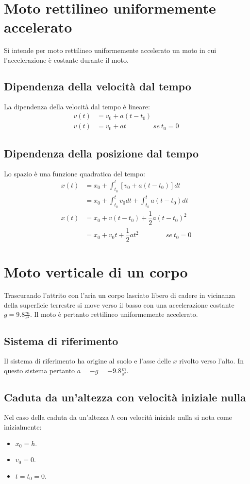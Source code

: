 \documentclass[class=book, crop=false, oneside, 12pt]{standalone}
\begin{document}
\section{Moto rettilineo uniformemente accelerato}
Si intende per moto rettilineo uniformemente accelerato un moto in cui l'accelerazione \`e costante durante il moto.
  \subsection{Dipendenza della velocit\`a dal tempo}
	La dipendenza della velocit\`a dal tempo \`e lineare:
	\begin{align*}
	  v(t) &=v_0+a(t-t_0)\\
		v(t) &=v_0+at\qquad\qquad se\ t_0 = 0
	\end{align*}
	\subsection{Dipendenza della posizione dal tempo}
	Lo spazio \`e una funzione quadratica del tempo:
	\begin{align*}
		x(t) &= x_0 +\int_{t_0}^t [v_0 + a(t-t_0)]dt\\
	       &= x_0 + \int_{t_0}^t v_0dt + \int_{t_0}^t a(t-t_0)dt\\
	  x(t) &= x_0 + v(t-t_0) +\dfrac{1}{2}a(t-t_0)^2\\
		     &= x_0 + v_0t +\dfrac{1}{2}at^2\qquad\qquad se\ t_0 = 0
	\end{align*}
\section{Moto verticale di un corpo}
Trascurando l'attrito con l'aria un corpo lasciato libero di cadere in vicinanza della superficie terrestre si move verso il basso con una accelerazione costante $g=9.8\frac{m}{s^2}$.
Il moto \`e pertanto rettilineo uniformemente accelerato.
	\subsection{Sistema di riferimento}
	Il sistema di riferimento ha origine al suolo e l'asse delle $x$ rivolto verso l'alto.
	In questo sistema pertanto $a=-g=-9.8\frac{m}{s^2}$.
	\subsection{Caduta da un'altezza con velocit\`a iniziale nulla}
	Nel caso della caduta da un'altezza $h$ con velocit\`a iniziale nulla si nota come inizialmente:
	\begin{multicols}{3}
		\begin{itemize}
			\item $x_0 = h$.
			\item $v_0 = 0$.
			\item $t = t_0 = 0$.
		\end{itemize}
	\end{multicols}
\end{document}
